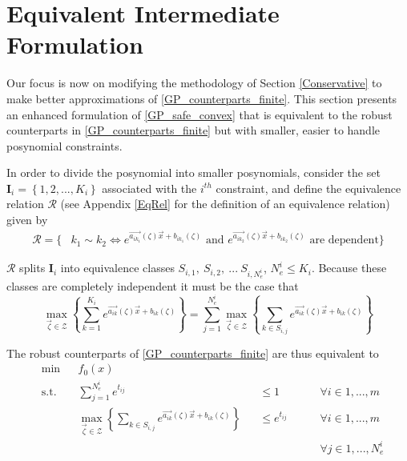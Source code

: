 \section{Equivalent Intermediate Formulation} \label{EqIntFor} Our focus is now on modifying the methodology of Section \ref{Conservative} to make better approximations of \eqref{GP_counterparts_finite}. This section presents an enhanced formulation of \eqref{GP_safe_convex} that is equivalent to the robust counterparts in \eqref{GP_counterparts_finite} but with smaller, easier to handle posynomial constraints.

In order to divide the posynomial into smaller posynomials, consider the set $\mathbf{I}_i = \left\{ 1,2,...,K_i\right\} $ associated with the $i^{th}$ constraint, and define the equivalence relation $\mathcal{R}$ (see Appendix \ref{EqRel} for the definition of an equivalence relation) given by
\begin{equation}
\begin{aligned}
\mathcal{R} = \{&k_1 \sim k_2 \iff e^{\vec{a_{ik_1}}\left(\zeta\right)\vec{x} + b_{ik_1}\left(\zeta\right)} \text{ and } e^{\vec{a_{ik_2}}\left(\zeta\right)\vec{x} + b_{ik_2}\left(\zeta\right)} \text{ are dependent} \}
\end{aligned}
\label{equivalence_relation}
\end{equation}

$\mathcal{R}$ splits $\mathbf{I}_i$ into equivalence classes $S_{i,1},\ S_{i,2},\ ...\ S_{i,N_e^i}$, $N_e^i \leq K_i$. Because these classes are completely independent it must be the case that
$$
\max_{\vec{\zeta} \in \mathcal{Z}} \left\{\textstyle{\sum}_{k=1}^{K_i}e^{\vec{a_{ik}}\left(\zeta\right)\vec{x} + b_{ik}\left(\zeta\right)}\right\} = \textstyle{\sum}_{j=1}^{N_e^i} {\displaystyle \max_{\vec{\zeta} \in \mathcal{Z}}} \left\{\textstyle{\sum}_{k \in S_{i,j}}e^{\vec{a_{ik}}\left(\zeta\right)\vec{x} + b_{ik}\left(\zeta\right)}\right\}
$$

The robust counterparts of \eqref{GP_counterparts_finite} are thus equivalent to
\begin{equation}
\begin{aligned}
&\min &&f_0(x)\\
&\text{s.t.} &&\textstyle{\sum}_{j=1}^{N_e^i} e^{t_{ij}} &&\leq 1 \qquad &&\forall i \in 1,...,m\\
& &&\max_{\vec{\zeta} \in \mathcal{Z}} \left\{\textstyle{\sum}_{k \in S_{i,j}} e^{\vec{a_{ik}}\left(\zeta\right)\vec{x} + b_{ik}\left(\zeta\right)} \right\} &&\leq e^{t_{ij}} &&\forall i \in 1,...,m\\
& && && &&\forall j \in 1, ..., N_e^i\\
\end{aligned}
\label{equivalent_class_setP}
\end{equation}

